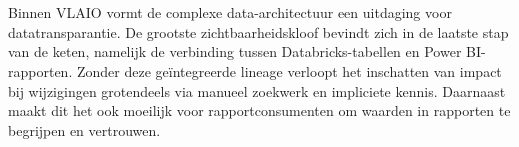 
%
%
%
%
%

%



\chapter*{}

Binnen VLAIO vormt de complexe data-ar\-chi\-tec\-tuur een uitdaging voor datatransparantie. De grootste zichtbaarheidskloof bevindt zich in de laatste stap van de keten, namelijk de verbinding tussen Data\-bricks-ta\-bel\-len en Power BI-rap\-por\-ten. Zonder deze geïntegreerde lineage verloopt het inschatten van impact bij wijzigingen grotendeels via manueel zoekwerk en impliciete kennis. Daarnaast maakt dit het ook moeilijk voor rapportconsumenten om waarden in rapporten te begrijpen en vertrouwen.\\

